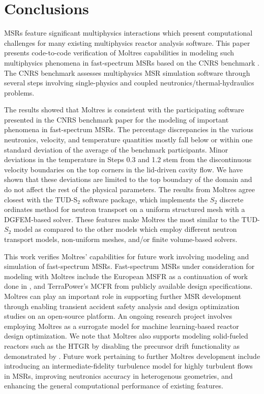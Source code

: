 \section{Conclusions}

\glspl{MSR} feature significant multiphysics interactions which present
computational challenges for many existing multiphysics reactor analysis
software. This paper presents code-to-code verification of Moltres
capabilities in modeling such multiphysics phenomena in fast-spectrum
\glspl{MSR} based on the CNRS benchmark \cite{tiberga_results_2020}.
The CNRS benchmark assesses multiphysics \gls{MSR} simulation
software through several steps involving single-physics and coupled
neutronics/thermal-hydraulics problems.

The results showed that Moltres is consistent with the participating software
presented in the CNRS benchmark paper for the modeling of important phenomena
in fast-spectrum \glspl{MSR}. The percentage discrepancies in the various
neutronics, velocity, and temperature quantities mostly fall below or within
one standard deviation of the average of the benchmark participants.
Minor deviations in the temperature in Steps 0.3 and 1.2 
stem from the discontinuous velocity
boundaries on the top corners in the lid-driven cavity flow. We have shown that
these deviations are limited to the top boundary of the domain and do not
affect the rest of the physical parameters. The results from
Moltres agree closest with the TUD-S$_2$ software package, which implements the
$S_2$ discrete ordinates method for
neutron transport on a uniform structured mesh with a \gls{DGFEM}-based solver.
These features make Moltres the most similar to the TUD-$S_2$ model as compared
to the other models which employ different neutron transport models,
non-uniform meshes, and/or finite volume-based solvers.

This work verifies Moltres' capabilities for future work involving modeling and
simulation of fast-spectrum \glspl{MSR}. Fast-spectrum \glspl{MSR}
under consideration for modeling with Moltres include the European \gls{MSFR}
as a continuation of work done in \cite{park_advancement_2020}, and
TerraPower's \gls{MCFR} \cite{terrapower_terrapower_2021} from publicly
available design specifications. Moltres can play an important role in
supporting further \gls{MSR} development through enabling transient accident
safety analysis and design optimization studies on an open-source platform.
An ongoing research project involves employing Moltres as a
surrogate model for machine learning-based reactor design optimization.
We note that Moltres also supports modeling solid-fueled reactors such as the
\gls{HTGR} by disabling the precursor drift functionality as demonstrated by
\cite{fairhurst-agosta_multi-physics_2020}. Future work pertaining to
further Moltres development include introducing an intermediate-fidelity
turbulence model for highly turbulent flows in \glspl{MSR}, improving
neutronics accuracy in heterogenous geometries, and enhancing the general
computational performance of existing features.

\FloatBarrier
